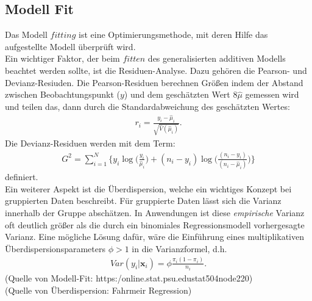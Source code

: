 \documentclass[12pt]{scrreprt}
\begin{document}
\subsection{Modell Fit}
Das Modell $fitting$ ist eine Optimierungsmethode, mit deren Hilfe das aufgestellte Modell überprüft wird.\\ 
Ein wichtiger Faktor, der beim $fitten$ des generalisierten additiven Modells beachtet werden sollte, ist die Residuen-Analyse. Dazu gehören die Pearson- und Devianz-Resiuden. Die Pearson-Residuen berechnen Größen indem der Abstand zwischen Beobachtungspunkt ($y$) und dem geschätzten Wert 8$\hat\mu$ gemessen wird und teilen das, dann durch die Standardabweichung des geschätzten Wertes:
\begin{align}
r_{i}=\frac{y_{i}-\hat\mu_{i}}{\sqrt{\hat V(\hat\mu_{i})}}.
\end{align}
Die Devianz-Residuen werden mit dem Term:
\begin{align}
G^2=\sum_{i=1}^N\bigg\{y_{i}\log\bigg(\frac{y_{i}}{\hat\mu_{i}}\bigg)+(n_{i}-y_{i})\log\bigg(\frac{(n_{i}-y_{i})}{(n_{i}-\hat\mu_{i})}\bigg) \bigg\}
\end{align}
definiert. \\
Ein weiterer Aspekt ist die Überdispersion, welche ein wichtiges Konzept bei gruppierten Daten beschreibt. Für gruppierte Daten lässt sich die Varianz innerhalb der Gruppe abschätzen. In Anwendungen ist diese \textit{empirische} Varianz oft deutlich größer als die durch ein binomiales Regressionsmodell vorhergesagte Varianz. Eine mögliche Lösung dafür, wäre die Einführung eines multiplikativen Überdispersionsparameters $\phi > 1$ in die Varianzformel, d.h.
\begin{align}
Var(y_{i}|\textbf{x}_{i})=\phi \frac{\pi_{i}(1-\pi_{i})}{n_{i}}.
\end{align}
(Quelle von Modell-Fit: https:\//online.stat.psu.edu\/stat504\/node\/220\/) \\
(Quelle von Überdispersion: Fahrmeir Regression)
\end{document}

